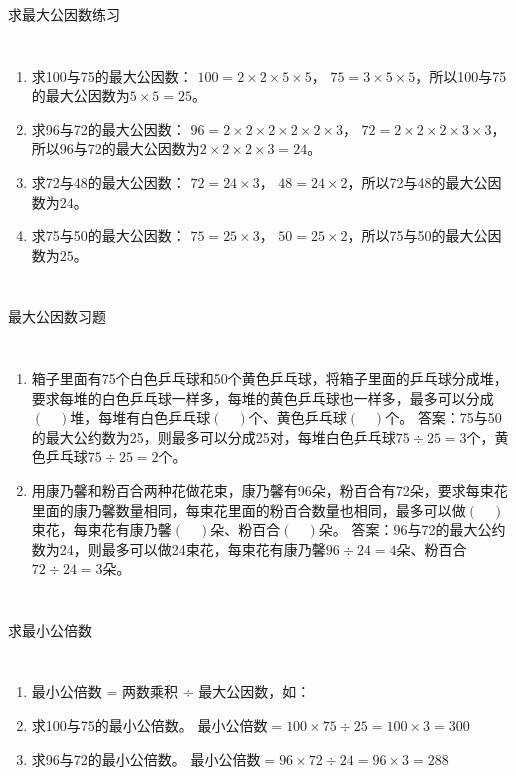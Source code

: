 \documentclass[aspectratio=169]{ctexbeamer} %
\begin{document}
\begin{frame}[t]{求最大公因数练习}
\begin{columns}
\begin{enumerate}[label={\arabic*.}]
\item 求100与75的最大公因数： $100 = 2 \times 2 \times 5 \times 5$， $75 = 3 \times 5 \times 5$，所以100与75的最大公因数为$5 \times 5 = 25$。
\item 求96与72的最大公因数： $96 = 2 \times 2 \times 2 \times 2 \times 2 \times 3$， $72 = 2 \times 2 \times 2 \times 3 \times 3$，所以96与72的最大公因数为$2 \times 2 \times 2 \times 3  = 24$。
\item 求72与48的最大公因数： $72 = 24 \times 3$， $48 = 24 \times 2$，所以72与48的最大公因数为$24$。
\item 求75与50的最大公因数： $75 = 25 \times 3$， $50 = 25 \times 2$，所以75与50的最大公因数为$25$。
\end{enumerate}
\end{columns}
\end{frame}

\begin{frame}[t]{最大公因数习题}
\begin{columns}
\begin{enumerate}[label={\arabic*.}]
\item 箱子里面有75个白色乒乓球和50个黄色乒乓球，将箱子里面的乒乓球分成堆，要求每堆的白色乒乓球一样多，每堆的黄色乒乓球也一样多，最多可以分成$(\quad)$堆，每堆有白色乒乓球$(\quad)$个、黄色乒乓球$(\quad)$个。 \alert{答案：75与50的最大公约数为25，则最多可以分成25对，每堆白色乒乓球$75 \div 25 = 3$个，黄色乒乓球$75 \div 25 = 2$个。}
\item 用康乃馨和粉百合两种花做花束，康乃馨有96朵，粉百合有72朵，要求每束花里面的康乃馨数量相同，每束花里面的粉百合数量也相同，最多可以做$(\quad)$束花，每束花有康乃馨$(\quad)$朵、粉百合$(\quad)$朵。 \alert{答案：96与72的最大公约数为24，则最多可以做24束花，每束花有康乃馨$96 \div 24 = 4$朵、粉百合$72 \div 24 = 3$朵。}
\end{enumerate}
\end{columns}
\end{frame}

\begin{frame}[t]{求最小公倍数}
\begin{columns}
\begin{enumerate}[label={\arabic*.}]
\item 最小公倍数 = 两数乘积 ÷ 最大公因数，如：
\item 求100与75的最小公倍数。 最小公倍数$ = 100 \times 75 \div 25 = 100 \times 3 = 300$
\item 求96与72的最小公倍数。 最小公倍数$ = 96 \times 72 \div 24 = 96 \times 3 = 288$
\end{enumerate}
\end{columns}
\end{frame}
\end{document}
